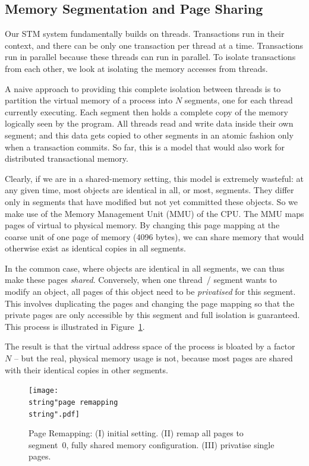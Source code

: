 \documentclass{sigplanconf}
\begin{document}
\subsection{Memory Segmentation and Page Sharing}

Our STM system fundamentally builds on threads. Transactions run in
their context, and there can be only one transaction per thread at a
time. Transactions run in parallel because these threads can run in
parallel. To isolate transactions from each other, we look
at isolating the memory accesses from threads.

A naive approach to providing this complete isolation between threads
is to partition the virtual memory of a process into $N$ segments, one
for each thread currently executing.  Each segment then holds a
complete copy of the memory logically seen by the program.  All
threads read and write data inside their own segment; and this data
gets copied to other segments in an atomic fashion only when a
transaction commits.  So far, this is a model that would also work for
distributed transactional memory.

Clearly, if we are in a shared-memory setting, this model is extremely
wasteful: at any given time, most objects are identical in all, or
most, segments.  They differ only in segments that have modified but
not yet committed these objects.  So we make use of the Memory
Management Unit (MMU) of the CPU.  The MMU maps pages of virtual to
physical memory.  By changing this page mapping at the coarse unit of
one page of memory (4096 bytes), we can share memory that would
otherwise exist as identical copies in all segments.

In the common case, where objects are identical in all segments, we
can thus make these pages \emph{shared}. Conversely, when one thread~/
segment wants to modify an object, all pages of this object need to be
\emph{privatised} for this segment. This involves duplicating the
pages and changing the page mapping so that the private pages are only
accessible by this segment and full isolation is guaranteed.  This
process is illustrated in Figure~\ref{fig:Page-Remapping}.

The result is that the virtual address space of the process is bloated
by a factor $N$ -- but the real, physical memory usage is not, because most
pages are shared with their identical copies in other segments.

\begin{figure}[h]
  \centering
  \texttt{[image: \\string"page remapping\\string".pdf]}
  \caption{Page Remapping: (I) initial setting. (II) remap all pages to
    segment~0, fully shared memory configuration. (III) privatise single
    pages.\label{fig:Page-Remapping}}
\end{figure}
\end{document}
